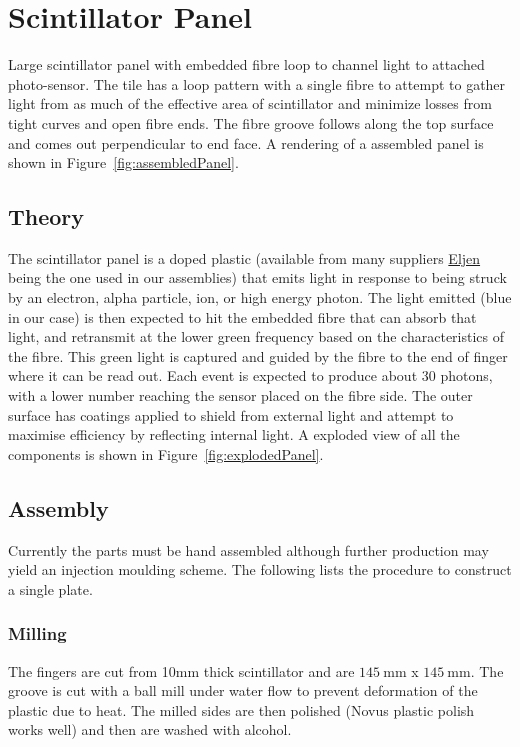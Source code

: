 \section{Scintillator Panel}
Large scintillator panel with embedded fibre loop to channel light to attached photo-sensor. The tile has a loop pattern with a single fibre to attempt to gather light from as much of the effective area of scintillator and minimize losses from tight curves and open fibre ends. The fibre groove follows along the top surface and comes out perpendicular to end face. A rendering of a assembled panel is shown in Figure~\ref{fig:assembledPanel}.


\subsection{Theory}
The scintillator panel is a doped plastic (available from many suppliers \href{http://www.eljentechnology.com/}{Eljen} being the one used in our assemblies) that emits light in response to being struck by an electron, alpha particle, ion, or high energy photon. The light emitted (blue in our case) is then expected to hit the embedded fibre that can absorb that light, and retransmit at the lower green frequency based on the characteristics of the fibre. This green light is captured and guided by the fibre to the end of finger where it can be read out. Each event is expected to produce about 30 photons, with a lower number reaching the sensor placed on the fibre side. The outer surface has coatings applied to shield from external light and attempt to maximise efficiency by reflecting internal light. A exploded view of all the components is shown in Figure~\ref{fig:explodedPanel}.

\subsection{Assembly}
Currently the parts must be hand assembled although further production may yield an injection moulding scheme. The following lists the procedure to construct a single plate.

\subsubsection{Milling}
The fingers are cut from 10mm thick scintillator and are $\SI{145}{\milli\meter}$ x $\SI{145}{\milli\meter}$. The groove is cut with a ball mill under water flow to prevent deformation of the plastic due to heat. The milled sides are then polished (Novus plastic polish works well) and then are washed with alcohol.

